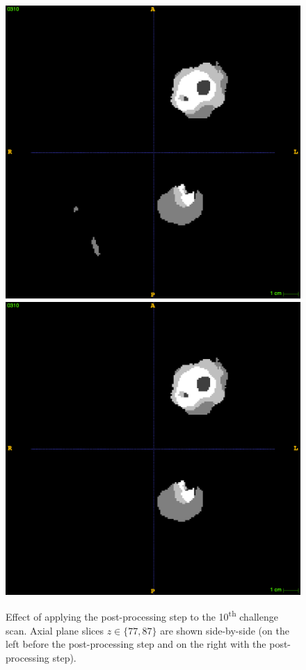 \documentclass[12pt,a4paper,twoside,openright]{report}
\begin{document}
\begin{figure}[h]
	\vspace{0.5cm}
	\includegraphics[scale = 0.1]{challenge10_no_post_87}
	\includegraphics[scale = 0.1]{challenge10_with_post_87}
	\caption[Effect of applying the post-processing step.]{Effect of applying the post-processing step to the 10\textsuperscript{th} challenge scan. Axial plane slices $z \in \{77,87\}$ are shown side-by-side (on the left before the post-processing step and on the right with the post-processing step).}
	\label{fig:connected_components_example}
\end{figure}
\end{document}
